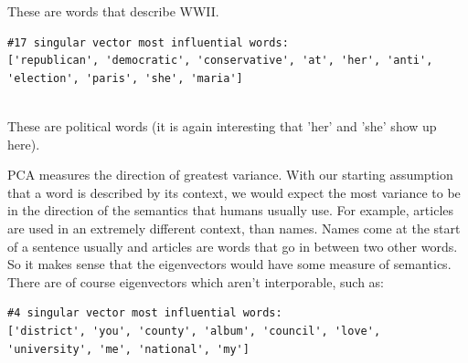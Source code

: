 \documentclass[12pt]{article}
\theoremstyle{definitionstyle}
\begin{document}
\begin{enumerate}[leftmargin=\labelsep]
\begin{enumerate}[label=\textbf{(\alph*)}]
\begin{lstlisting}
                \end{lstlisting}

                These are words that describe WWII.
                
                \begin{lstlisting}
#17 singular vector most influential words:  
['republican', 'democratic', 'conservative', 'at', 'her', 'anti', 'election', 'paris', 'she', 'maria']
                
                \end{lstlisting}

                These are political words (it is again interesting that 'her' and 'she' show up here).

                PCA measures the direction of greatest variance. With our starting assumption that a word is described by its context, we would expect the most variance to be in the direction of the semantics that humans usually use. For example, articles are used in an extremely different context, than names. Names come at the start of a sentence usually and articles are words that go in between two other words. So it makes sense that the eigenvectors would have some measure of semantics. There are of course eigenvectors which aren't interporable, such as:
                \begin{lstlisting}
#4 singular vector most influential words: 
['district', 'you', 'county', 'album', 'council', 'love', 'university', 'me', 'national', 'my']
                \end{lstlisting}


\end{enumerate}
\end{enumerate}
\end{document}
